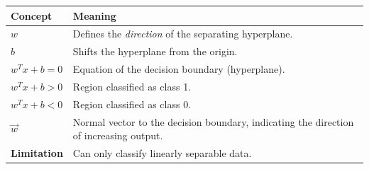 \begin{table}[!htp]
    \centering
    \begin{tabular}{@{} l p{23em} @{}}
        \toprule
        \textbf{Concept} & \textbf{Meaning} \\
        \midrule
        $w$ & Defines the \emph{direction} of the separating hyperplane. \\[.3em]
        $b$ & Shifts the hyperplane from the origin. \\[.3em]
        $w^{T} x + b = 0$ & Equation of the decision boundary (hyperplane). \\[.3em]
        $w^{T} x + b > 0$ & Region classified as class 1. \\[.3em]
        $w^{T} x + b < 0$ & Region classified as class 0. \\[.3em]
        $\vec{w}$ & Normal vector to the decision boundary, indicating the direction of increasing output. \\[.3em]
        \textbf{Limitation} & Can only classify linearly separable data. \\
        \bottomrule
    \end{tabular}
\end{table}